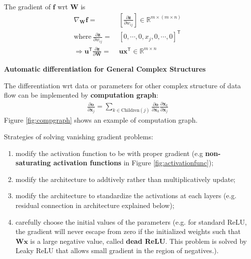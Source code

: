 \begin{enumerate}[{(1)}]
    The gradient of $\bm{f}$ wrt $\mathbf{W}$ is 
    \begin{align}
        \nabla_\mathbf{W}\bm{f}
        =&~ \left[\frac{\partial\bm{z}}{\partial w_{ij}}\right]\in\mathbb{R}^{m\times(m\times n)} \\
        \text{where}~\frac{\partial\bm{z}}{\partial w_{ij}}
        =&~ [0,\cdots,0,x_j,0,\cdots,0]^\mathsf{T} \\
        \Rightarrow\bm{u}^\mathsf{T}\frac{\partial\bm{z}}{\partial \mathbf{W}}
        =&~ \bm{ux}^\mathsf{T}\in\mathbb{R}^{m \times n}
    \end{align}
\end{enumerate}

\begin{example}
    \textbf{Automatic differentiation for General Complex Structures}

    The differentiation wrt data or parameters for other complex structure of data flow can be 
    implemented by \textbf{computation graph}:
    \begin{gather}
        \frac{\partial \bm{o}}{\partial \bm{x}_j} 
        = \sum_{k\in\mathrm{Children}(j)}
        \frac{\partial\bm{o}}{\partial\bm{x}_k}\frac{\partial\bm{x}_k}{\partial\bm{x}_j}
    \end{gather}
    Figure \ref{fig:compgraph} shows an example of computation graph.
\end{example}





Strategies of solving vanishing gradient problems:
\begin{enumerate}[{(1)}]
    \item modify the activation function to be with proper gradient (e.g \textbf{non-saturating activation functions} in Figure \ref{fig:activationfunc});
    \item modify the architecture to addtively rather than multiplicatively update;
    \item modify the architecture to standardize the activations at each layers (e.g. residual connection in architecture explained below);
    \item carefully choose the initial values of the parameters 
    (e.g. for standard ReLU, the gradient will never escape from zero 
    if the initialized weights such that $\mathbf{W}\bm{x}$ is a large negative value, 
    called \textbf{dead ReLU}. 
    This problem is solved by Leaky ReLU that allows small gradient in the region of negatives.).
\end{enumerate}


